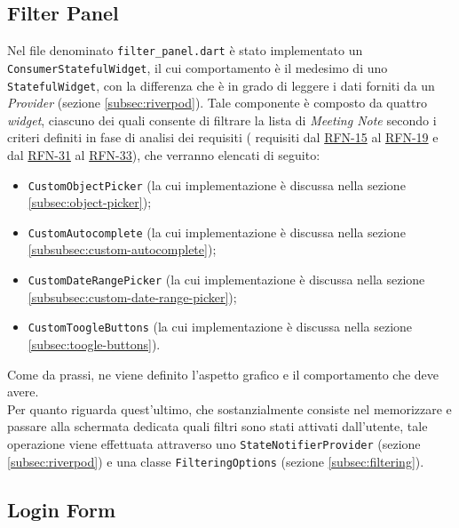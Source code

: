 \subsection{Filter Panel}
\label{subsec:filter-panel}

Nel file denominato \lstinline{filter_panel.dart} è stato implementato un \lstinline{ConsumerStatefulWidget}\cite{site:reading-provider}, il cui comportamento è il medesimo di uno \lstinline{StatefulWidget}, con la differenza che è in grado di leggere i dati forniti da un \emph{Provider} (sezione \ref{subsec:riverpod}).
Tale componente è composto da quattro \emph{widget}, ciascuno dei quali consente di filtrare la lista di \emph{Meeting Note}  secondo i criteri definiti in fase di analisi dei requisiti ( requisiti dal \hyperref[RFN-15]{RFN-15} al \hyperref[RFN-19]{RFN-19} e dal \hyperref[RFN-31]{RFN-31} al \hyperref[RFN-33]{RFN-33}), che verranno elencati di seguito:
\begin{itemize}
    \item \lstinline{CustomObjectPicker} (la cui implementazione è discussa nella sezione \ref{subsec:object-picker});
    \item \lstinline{CustomAutocomplete} (la cui implementazione è discussa nella sezione \ref{subsubsec:custom-autocomplete});
    \item \lstinline{CustomDateRangePicker} (la cui implementazione è discussa nella sezione \ref{subsubsec:custom-date-range-picker});
    \item \lstinline{CustomToogleButtons} (la cui implementazione è discussa nella sezione \ref{subsec:toogle-buttons}).
\end{itemize}
Come da prassi, ne viene definito l'aspetto grafico e il comportamento che deve avere.\\
Per quanto riguarda quest'ultimo, che sostanzialmente consiste nel memorizzare e passare alla schermata dedicata quali filtri sono stati attivati dall'utente, tale operazione viene effettuata attraverso uno \lstinline{StateNotifierProvider} (sezione \ref{subsec:riverpod}) e una classe \lstinline{FilteringOptions} (sezione \ref{subsec:filtering}).

\subsection{Login Form}
\label{subsec:login-form}

